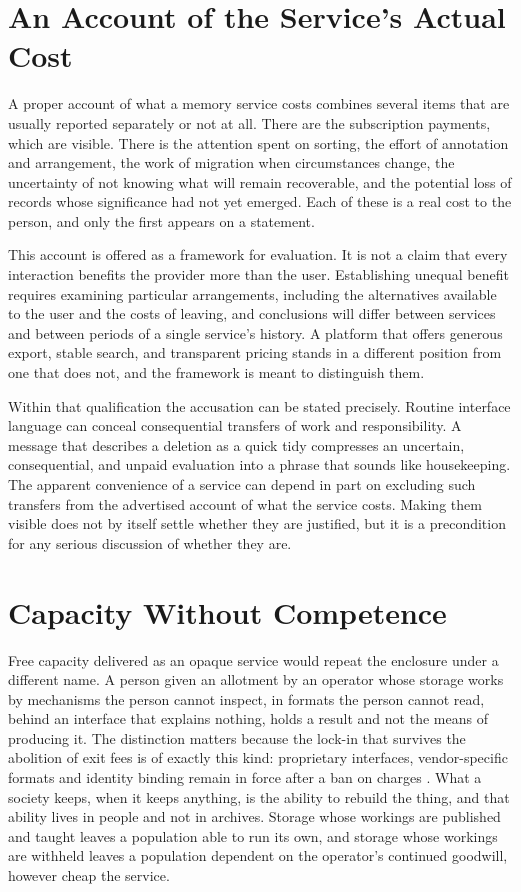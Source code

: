 \documentclass[12pt]{article}
\begin{document}
\section{An Account of the Service's Actual Cost}

A proper account of what a memory service costs combines several items that are usually reported separately or not at all. There are the subscription payments, which are visible. There is the attention spent on sorting, the effort of annotation and arrangement, the work of migration when circumstances change, the uncertainty of not knowing what will remain recoverable, and the potential loss of records whose significance had not yet emerged. Each of these is a real cost to the person, and only the first appears on a statement.

This account is offered as a framework for evaluation. It is not a claim that every interaction benefits the provider more than the user. Establishing unequal benefit requires examining particular arrangements, including the alternatives available to the user and the costs of leaving, and conclusions will differ between services and between periods of a single service's history. A platform that offers generous export, stable search, and transparent pricing stands in a different position from one that does not, and the framework is meant to distinguish them.

Within that qualification the accusation can be stated precisely. Routine interface language can conceal consequential transfers of work and responsibility. A message that describes a deletion as a quick tidy compresses an uncertain, consequential, and unpaid evaluation into a phrase that sounds like housekeeping. The apparent convenience of a service can depend in part on excluding such transfers from the advertised account of what the service costs. Making them visible does not by itself settle whether they are justified, but it is a precondition for any serious discussion of whether they are.

\section{Capacity Without Competence}

Free capacity delivered as an opaque service would repeat the enclosure under a different name. A person given an allotment by an operator whose storage works by mechanisms the person cannot inspect, in formats the person cannot read, behind an interface that explains nothing, holds a result and not the means of producing it. The distinction matters because the lock-in that survives the abolition of exit fees is of exactly this kind: proprietary interfaces, vendor-specific formats and identity binding remain in force after a ban on charges \cite{cloudmagazin}. What a society keeps, when it keeps anything, is the ability to rebuild the thing, and that ability lives in people and not in archives. Storage whose workings are published and taught leaves a population able to run its own, and storage whose workings are withheld leaves a population dependent on the operator's continued goodwill, however cheap the service.
\end{document}
